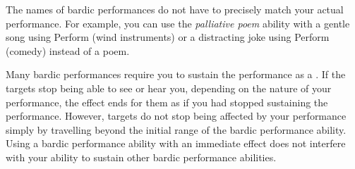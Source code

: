        The names of bardic performances do not have to precisely match your actual performance.
        For example, you can use the \textit{palliative poem} ability with a gentle song using Perform (wind instruments) or a distracting joke using Perform (comedy) instead of a poem.

        Many bardic performances require you to sustain the performance as a .
        If the targets stop being able to see or hear you, depending on the nature of your performance, the effect ends for them as if you had stopped sustaining the performance.
        However, targets do not stop being affected by your performance simply by travelling beyond the initial range of the bardic performance ability.
        Using a bardic performance ability with an immediate effect does not interfere with your ability to sustain other bardic performance abilities.
